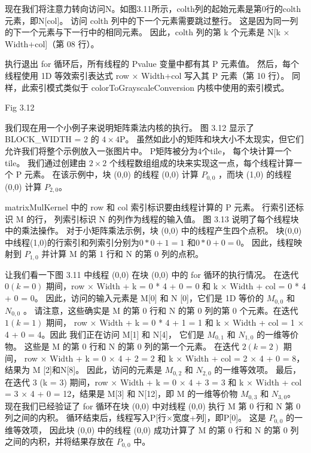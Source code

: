 现在我们将注意力转向访问N。如图3.11所示，colth列的起始元素是第0行的colth元素，即N[col]。 
访问 colth 列中的下一个元素需要跳过整行。 这是因为同一列的下一个元素与下一行中的相同元素。 
因此，colth 列的第 k 个元素是 N[k × Width+col]（第 08 行）。

执行退出 for 循环后，所有线程的 Pvalue 变量中都有其 P 元素值。 
然后，每个线程使用 1D 等效索引表达式 row × Width+col 写入其 P 元素（第 10 行）。 
同样，此索引模式类似于 colorToGrayscaleConversion 内核中使用的索引模式。

{\color{red} Fig 3.12}

我们现在用一个小例子来说明矩阵乘法内核的执行。 图 3.12 显示了 BLOCK\_WIDTH = 2 的 $4\times 4$P。
虽然如此小的矩阵和块大小不太现实，但它们允许我们将整个示例放入一张图片中。 P矩阵被分为4个tile，
每个块计算一个tile。 我们通过创建由 $2\times 2$ 个线程数组组成的块来实现这一点，每个线程计算一个 P 元素。 
在该示例中，块 (0,0) 的线程 (0,0) 计算 $P_{0,0}$ ，而块 (1,0) 的线程 (0,0) 计算 $P_{2,0}$。

matrixMulKernel 中的 row 和 col 索引标识要由线程计算的 P 元素。 行索引还标识 M 的行，
列索引标识 N 的列作为线程的输入值。 图 3.13 说明了每个线程块中的乘法操作。 
对于小矩阵乘法示例，块 (0,0) 中的线程产生四个点积。 块(0,0)中线程(1,0)的行索引和列索引分别为$0*0 + 1 = 1$
和$0 * 0 + 0 = 0$。 因此，线程映射到 $P_{1,0}$ 并计算 M 的第 1 行和 N 的第 0 列的点积。

让我们看一下图 3.11 中线程 (0,0) 在块 (0,0) 中的 for 循环的执行情况。 
在迭代 $0(k = 0)$ 期间，row × Width + k = 0 * 4 + 0 = 0 和 k × Width + col = 0 * 4 + 0 = 0。
因此，访问的输入元素是 M[0] 和 N [0]，它们是 1D 等价的 $M_{0,0}$ 和 $N_{0,0}$ 。 
请注意，这些确实是 M 的第 0 行和 N 的第 0 列的第 0 个元素。在迭代 $1(k = 1)$ 期间，
row × Width + k = 0 * 4 + 1 = 1 和 k × Width + col = 1 × 4 + 0 = 4。因此 我们正在访问 M[1] 和 N[4]，
它们是 $M_{0,1}$ 和 $N_{1,0}$ 的一维等价物。 这些是 M 的第 0 行和 N 的第 0 列的第一个元素。
在迭代 $2(k = 2)$ 期间， row × Width + k = 0 × 4 + 2 = 2 和 k × Width + col = 2 × 4 + 0 = 8，
结果为 M [2]和N[8]。 因此，访问的元素是 $M_{0,2}$ 和 $N_{2,0}$ 的一维等效项。
最后，在迭代 3 (k = 3) 期间，row × Width + k = 0 × 4 + 3 = 3 
和 k × Width + col = 3 × 4 + 0 = 12，结果是 M[3] 和 N[12]，即 M 的一维等价物 $M_{0,3}$ 和 $N_{3,0}$。 
现在我们已经验证了 for 循环在块 (0,0) 中对线程 (0,0) 执行 M 第 0 行和 N 第 0 列之间的内积。 
循环结束后，线程写入P[行×宽度+列]，即P[0]。 这是 $P_{0,0}$ 的一维等效项，
因此块 (0,0) 中的线程 (0,0) 成功计算了 M 的第 0 行和 N 的第 0 列之间的内积，并将结果存放在 $P_{0,0}$ 中。

